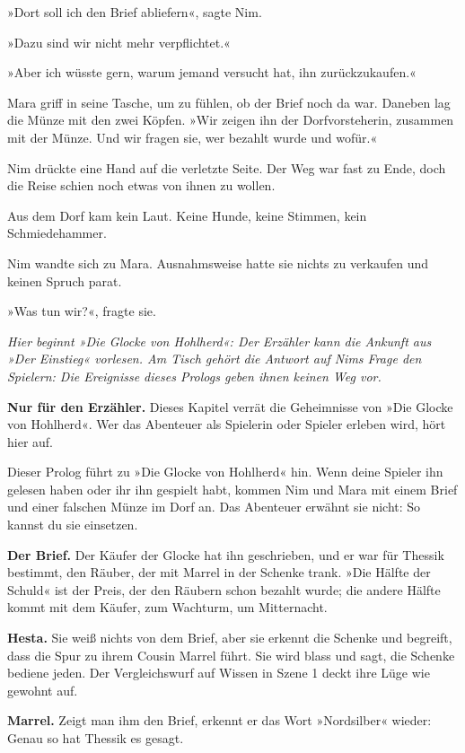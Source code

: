 \documentclass[10pt,a4paper]{article}
\begin{document}
»Dort soll ich den Brief abliefern«, sagte Nim.

»Dazu sind wir nicht mehr verpflichtet.«

»Aber ich wüsste gern, warum jemand versucht hat, ihn zurückzukaufen.«

Mara griff in seine Tasche, um zu fühlen, ob der Brief noch da war. Daneben lag die Münze mit den zwei Köpfen. »Wir zeigen ihn der Dorfvorsteherin, zusammen mit der Münze. Und wir fragen sie, wer bezahlt wurde und wofür.«

Nim drückte eine Hand auf die verletzte Seite. Der Weg war fast zu Ende, doch die Reise schien noch etwas von ihnen zu wollen.

Aus dem Dorf kam kein Laut. Keine Hunde, keine Stimmen, kein Schmiedehammer.

Nim wandte sich zu Mara. Ausnahmsweise hatte sie nichts zu verkaufen und keinen Spruch parat.

»Was tun wir?«, fragte sie.

\emph{Hier beginnt »Die Glocke von Hohlherd«: Der Erzähler kann die Ankunft aus »Der Einstieg« vorlesen. Am Tisch gehört die Antwort auf Nims Frage den Spielern: Die Ereignisse dieses Prologs geben ihnen keinen Weg vor.}
\endgroup
\clearpage
{}
\begin{rpgnote}
\textbf{Nur für den Erzähler.} Dieses Kapitel verrät die Geheimnisse von »Die Glocke von Hohlherd«. Wer das Abenteuer als Spielerin oder Spieler erleben wird, hört hier auf.
\end{rpgnote}
Dieser Prolog führt zu »Die Glocke von Hohlherd« hin. Wenn deine Spieler ihn gelesen haben oder ihr ihn gespielt habt, kommen Nim und Mara mit einem Brief und einer falschen Münze im Dorf an. Das Abenteuer erwähnt sie nicht: So kannst du sie einsetzen.

\textbf{Der Brief.} Der Käufer der Glocke hat ihn geschrieben, und er war für Thessik bestimmt, den Räuber, der mit Marrel in der Schenke trank. »Die Hälfte der Schuld« ist der Preis, der den Räubern schon bezahlt wurde; die andere Hälfte kommt mit dem Käufer, zum Wachturm, um Mitternacht.

\textbf{Hesta.} Sie weiß nichts von dem Brief, aber sie erkennt die Schenke und begreift, dass die Spur zu ihrem Cousin Marrel führt. Sie wird blass und sagt, die Schenke bediene jeden. Der Vergleichswurf auf Wissen in Szene 1 deckt ihre Lüge wie gewohnt auf.

\textbf{Marrel.} Zeigt man ihm den Brief, erkennt er das Wort »Nordsilber« wieder: Genau so hat Thessik es gesagt.
\end{document}

